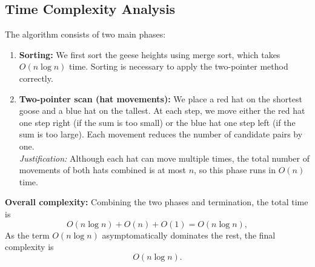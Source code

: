 \documentclass[12pt]{article}
\begin{document}
\subsection*{Time Complexity Analysis}

The algorithm consists of two main phases:

\begin{enumerate}
    \item \textbf{Sorting:} We first sort the geese heights using merge sort, which takes \(O(n \log n)\) time. Sorting is necessary to apply the two-pointer method correctly.

    \item \textbf{Two-pointer scan (hat movements):}  
    We place a red hat on the shortest goose and a blue hat on the tallest. At each step, we move either the red hat one step right (if the sum is too small) or the blue hat one step left (if the sum is too large). Each movement reduces the number of candidate pairs by one. \\
    \emph{Justification:} Although each hat can move multiple times, the total number of movements of both hats combined is at most \(n\), so this phase runs in \(O(n)\) time.
\end{enumerate}

\noindent
\textbf{Overall complexity:}  
Combining the two phases and termination, the total time is
\[
O(n \log n) + O(n) + O(1) = O(n \log n),
\]
As the term $O(n \log n)$ asymptomatically dominates the rest, the final complexity is
\[
\boxed{O(n \log n)}.
\]
\end{document}
